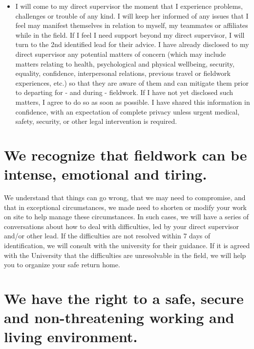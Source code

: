 \documentclass[
]{book}
\providecommand{\tightlist}{%
  \setlength{\itemsep}{0pt}\setlength{\parskip}{0pt}}
\begin{document}
\begin{itemize}
\tightlist
\item
  I will come to my direct supervisor the moment that I experience problems, challenges or trouble of any kind. I will keep her informed of any issues that I feel may manifest themselves in relation to myself, my teammates or affiliates while in the field. If I feel I need support beyond my direct supervisor, I will turn to the 2nd identified lead for their advice. I have already disclosed to my direct supervisor any potential matters of concern (which may include matters relating to health, psychological and physical wellbeing, security, equality, confidence, interpersonal relations, previous travel or fieldwork experiences, etc.) so that they are aware of them and can mitigate them prior to departing for - and during - fieldwork. If I have not yet disclosed such matters, I agree to do so as soon as possible. I have shared this information in confidence, with an expectation of complete privacy unless urgent medical, safety, security, or other legal intervention is required.
\end{itemize}

\hypertarget{we-recognize-that-fieldwork-can-be-intense-emotional-and-tiring.}{%
\section{We recognize that fieldwork can be intense, emotional and tiring.}\label{we-recognize-that-fieldwork-can-be-intense-emotional-and-tiring.}}

We understand that things can go wrong, that we may need to compromise, and that in exceptional circumstances, we made need to shorten or modify your work on site to help manage these circumstances. In such cases, we will have a series of conversations about how to deal with difficulties, led by your direct supervisor and/or other lead. If the difficulties are not resolved within 7 days of identification, we will consult with the university for their guidance. If it is agreed with the University that the difficulties are unresolvable in the field, we will help you to organize your safe return home.

\hypertarget{we-have-the-right-to-a-safe-secure-and-non-threatening-working-and-living-environment.}{%
\section{We have the right to a safe, secure and non-threatening working and living environment.}\label{we-have-the-right-to-a-safe-secure-and-non-threatening-working-and-living-environment.}}
\end{document}
